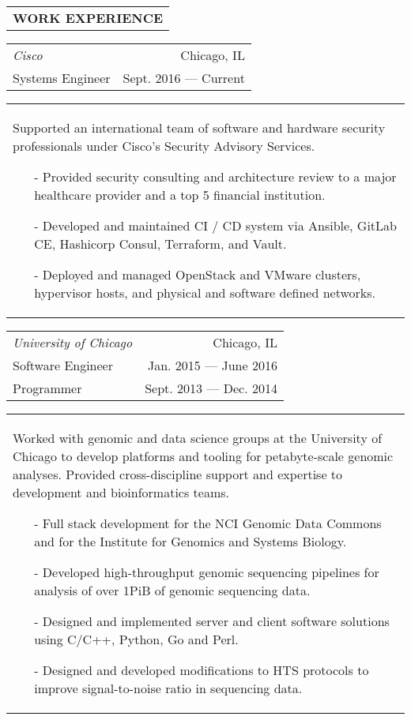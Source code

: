 \begin{tabularx}{\textwidth}{L}
    \textbf{WORK EXPERIENCE}
\end{tabularx}

\begin{tabularx}{\textwidth}{L R}
    \normalsize\textit{Cisco} & Chicago, IL \\
    Systems Engineer & Sept. 2016 --- Current \\
\end{tabularx}
\begin{tabularx}{\textwidth}{X}
    \vspace{1pt}
    Supported an international team of software and hardware security professionals under Cisco's Security Advisory Services.
    \begin{itemize}
        \itemsep{}
        \item[-] Provided security consulting and architecture review to a major healthcare provider and a top 5 financial institution.
        \item[-] Developed and maintained CI / CD system via Ansible, GitLab CE, Hashicorp Consul, Terraform, and Vault.
        \item[-] Deployed and managed OpenStack and VMware clusters, hypervisor hosts, and physical and software defined networks.
    \end{itemize}
\end{tabularx}

\begin{tabularx}{\textwidth}{L R}
    \normalsize\textit{University of Chicago} & Chicago, IL \\
    Software Engineer & Jan. 2015 --- June 2016 \\
    Programmer & Sept. 2013 --- Dec. 2014 \\
\end{tabularx}
\begin{tabularx}{\textwidth}{X}
    \vspace{1pt}
    Worked with genomic and data science groups at the University of Chicago to develop platforms and tooling for petabyte-scale genomic analyses. Provided cross-discipline support and expertise to development and bioinformatics teams.
    \begin{itemize}
        \itemsep{}
        \item[-] Full stack development for the NCI Genomic Data Commons and for the Institute for Genomics and Systems Biology.
        \item[-] Developed high-throughput genomic sequencing pipelines for analysis of over 1PiB of genomic sequencing data.
        \item[-] Designed and implemented server and client software solutions using C/C++, Python, Go and Perl.
        \item[-] Designed and developed modifications to HTS protocols to improve signal-to-noise ratio in sequencing data.
    \end{itemize}
\end{tabularx}

